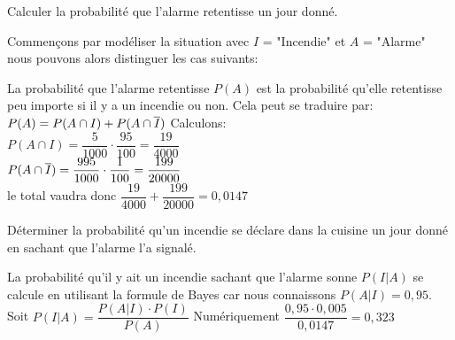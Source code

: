 \begin{exo}
  \begin{subexo}{	Calculer la probabilité que l'alarme retentisse un jour donné.}
    \begin{flushleft}
    Commençons par modéliser la situation avec $I$ = "Incendie" et $A$ = "Alarme" nous pouvons alors distinguer les cas suivants:
    \end{flushleft}
    \begin{center}
    \begin{flushleft}
      La probabilité que l'alarme retentisse $P(A)$ est la probabilité qu'elle retentisse peu importe si il y a un incendie ou non. Cela peut se traduire par: $P(A) = P(A \cap I) + P(A \cap \overline{I})$ Calculons:
      \\$P(A \cap I) = \dfrac{5}{1000} \cdot \dfrac{95}{100} = \dfrac{19}{4000}$
      \\$P(A \cap \overline{I}) = \dfrac{995}{1000} \cdot \dfrac{1}{100} = \dfrac{199}{20000}$
      \\ le total vaudra donc $\dfrac{19}{4000} + \dfrac{199}{20000} = 0,0147$
    \end{flushleft}
  \end{center}
  \end{subexo}
  \begin{subexo}{Déterminer la probabilité qu'un incendie se déclare dans la cuisine un jour donné en sachant que l'alarme l'a signalé.}
    \begin{flushleft}
      La probabilité qu'il y ait un incendie sachant que l'alarme sonne $P(I|A)$ se calcule en utilisant la formule de Bayes car nous connaissons $P(A|I) = 0,95$. Soit $P(I|A) = \dfrac{P(A|I)\cdot P(I)}{P(A)}$ Numériquement $\dfrac{0,95 \cdot 0,005}{0,0147} = 0,323$
    \end{flushleft}
  \end{subexo}
\end{exo}
